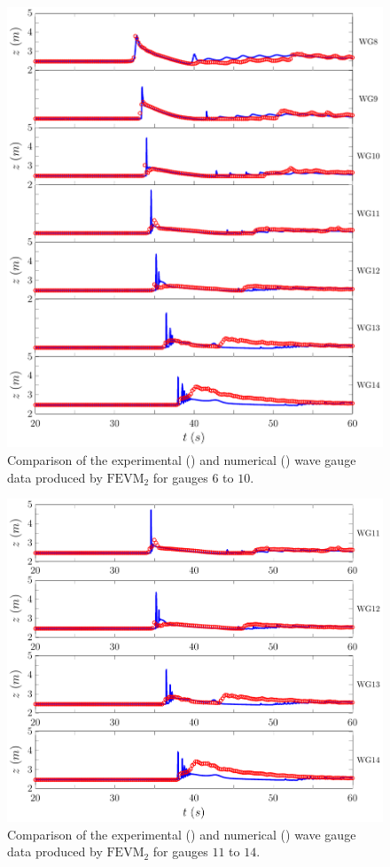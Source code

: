 \begin{figure}
	\centering
	\includegraphics[width=\textwidth]{./chp6/figures/Experiment/Roeber/Trial8/FEVM/LongWGs2.pdf}
	\caption{Comparison of the experimental () and numerical ({\color{blue}\solidrule}) wave gauge data produced by $\text{FEVM}_2$ for gauges $6$ to $10$.}
	\label{fig:Roeber8WG6to10FEVM}
\end{figure}  
\begin{figure}
	\centering
	\includegraphics[width=\textwidth]{./chp6/figures/Experiment/Roeber/Trial8/FEVM/LongWGs3.pdf}
	\caption{Comparison of the experimental () and numerical ({\color{blue}\solidrule}) wave gauge data produced by $\text{FEVM}_2$ for gauges $11$ to $14$.}
	\label{fig:Roeber8WG11to14FEVM}
\end{figure}         

